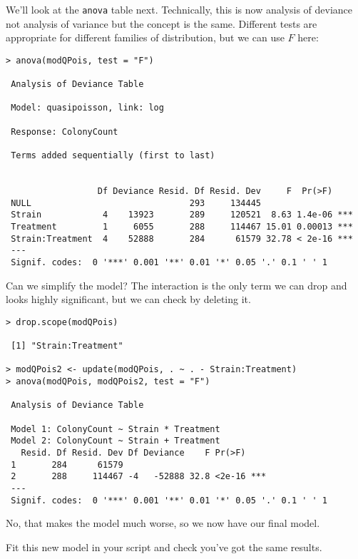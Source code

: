 We'll look at the {\tt anova} table next. Technically, this is now 
analysis of deviance not analysis of variance but the concept is the 
same. Different tests are appropriate for different families of 
distribution, but we can use $F$ here:

\begin{lstlisting}
> anova(modQPois, test = "F")

 Analysis of Deviance Table
 
 Model: quasipoisson, link: log
 
 Response: ColonyCount
 
 Terms added sequentially (first to last)
 
 
                  Df Deviance Resid. Df Resid. Dev     F  Pr(>F)    
 NULL                               293     134445                  
 Strain            4    13923       289     120521  8.63 1.4e-06 ***
 Treatment         1     6055       288     114467 15.01 0.00013 ***
 Strain:Treatment  4    52888       284      61579 32.78 < 2e-16 ***
 ---
 Signif. codes:  0 '***' 0.001 '**' 0.01 '*' 0.05 '.' 0.1 ' ' 1 
\end{lstlisting}

Can we simplify the model? The interaction is the only term we can drop 
and looks highly significant, but we can check by deleting it.

\begin{lstlisting}
> drop.scope(modQPois)

 [1] "Strain:Treatment"

> modQPois2 <- update(modQPois, . ~ . - Strain:Treatment)
> anova(modQPois, modQPois2, test = "F")

 Analysis of Deviance Table
 
 Model 1: ColonyCount ~ Strain * Treatment
 Model 2: ColonyCount ~ Strain + Treatment
   Resid. Df Resid. Dev Df Deviance    F Pr(>F)    
 1       284      61579                            
 2       288     114467 -4   -52888 32.8 <2e-16 ***
 ---
 Signif. codes:  0 '***' 0.001 '**' 0.01 '*' 0.05 '.' 0.1 ' ' 1 
\end{lstlisting}

No, that makes the model much worse, so we now have our final model. 

\begin{compactitem}[$\quad\star$]
	\item Fit this new model in your script and check you've got the same 
	results.
\end{compactitem}

